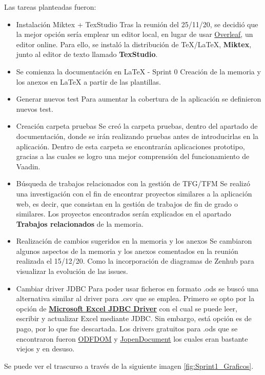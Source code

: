 Las tareas planteadas fueron:
\begin{itemize}
	\tightlist
	\item Instalación Miktex + TexStudio
		Tras la reunión del 25/11/20, se decidió que la mejor opción sería emplear un editor local, en lugar de usar \href{https://es.overleaf.com/}{Overleaf}, un editor online. Para ello, se instaló la distribución de TeX/LaTeX, \textbf{Miktex}, junto al editor de texto llamado \textbf{TexStudio}.
	\item Se comienza la documentación en LaTeX  - Sprint 0
		Creación de la memoria y los anexos en LaTeX a partir de las plantillas.
	\item Generar nuevos test
		Para aumentar la cobertura de la aplicación se definieron nuevos test.
	\item Creación carpeta pruebas
		Se creó la carpeta pruebas, dentro del apartado de documentación, donde se irán realizando pruebas antes de introducirlas en la aplicación. Dentro de esta carpeta se encontrarán aplicaciones prototipo, gracias a las cuales se logro una mejor comprensión del funcionamiento de Vaadin.
	\item Búsqueda de trabajos relacionados con la gestión de TFG/TFM
		Se realizó una investigación con el fin de encontrar proyectos similares a la aplicación web, es decir, que consistan en la gestión de trabajos de fin de grado o similares. Los proyectos encontrados serán explicados en el apartado \textbf{Trabajos relacionados} de la memoria.
	\item Realización de cambios sugeridos en la memoria y los anexos
		Se cambiaron algunos aspectos de la memoria y los anexos comentados en la reunión realizada el 15/12/20. Como la incorporación de diagramas de Zenhub para visualizar la evolución de las issues.
	\item Cambiar driver JDBC 
		Para poder usar ficheros en formato .ods se buscó una alternativa similar al driver para .csv que se emplea. Primero se opto por la opción de \textbf{\href{https://www.cdata.com/drivers/excel/jdbc/}{Microsoft Excel JDBC Driver}} con el cual se puede leer, escribir y actualizar Excel mediante JDBC. Sin embargo, está opción es de pago, por lo que fue descartada. Los drivers gratuitos para .ods que se encontraron fueron \href{https://odftoolkit.org/}{ODFDOM} y \href{http://www.jopendocument.org/}{JopenDocument} los cuales eran bastante viejos y en desuso. 
\end{itemize}

Se puede ver el trascurso a través de la siguiente imagen \ref{fig:Sprint1_Graficos}.

